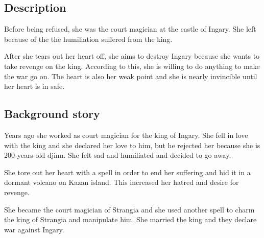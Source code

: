 \subsection{Description}
Before being refused, she was the court magician at the castle of Ingary. She left because of the the humiliation suffered from the king.

After she tears out her heart off, she aims to destroy Ingary because she wants to take revenge on the king. According to this, she is willing to do anything to make the war go on. The heart is also her weak point and she is nearly invincible until her heart is in safe.

\subsection{Background story}
Years ago she worked as court magician for the king of Ingary. She fell in love with the king and she declared her love to him, but he rejected her because she is 200-years-old djinn. She felt sad and humiliated and decided to go away.

She tore out her heart with a spell in order to end her suffering and hid it in a dormant volcano on Kazan island. This increased her hatred and desire for revenge.

She became the court magician of Strangia and she used another spell to charm the king of Strangia and manipulate him. She married the king and they declare war against Ingary.
